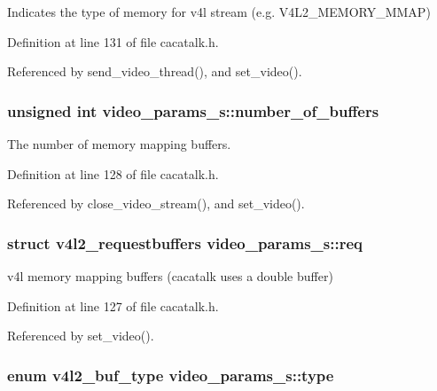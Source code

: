 \-Indicates the type of memory for v4l stream (e.\-g. \-V4\-L2\-\_\-\-M\-E\-M\-O\-R\-Y\-\_\-\-M\-M\-A\-P) 



\-Definition at line 131 of file cacatalk.\-h.



\-Referenced by send\-\_\-video\-\_\-thread(), and set\-\_\-video().

\hypertarget{structvideo__params__s_a61f9d75862499eb015a76c40c58abbd3}{
\subsubsection[{number\-\_\-of\-\_\-buffers}]{\setlength{\rightskip}{0pt plus 5cm}unsigned int {\bf video\-\_\-params\-\_\-s\-::number\-\_\-of\-\_\-buffers}}}\label{structvideo__params__s_a61f9d75862499eb015a76c40c58abbd3}


\-The number of memory mapping buffers. 



\-Definition at line 128 of file cacatalk.\-h.



\-Referenced by close\-\_\-video\-\_\-stream(), and set\-\_\-video().

\hypertarget{structvideo__params__s_a2688c600ca2c6aa4cd2e87cca2fa7909}{
\subsubsection[{req}]{\setlength{\rightskip}{0pt plus 5cm}struct v4l2\-\_\-requestbuffers {\bf video\-\_\-params\-\_\-s\-::req}}}\label{structvideo__params__s_a2688c600ca2c6aa4cd2e87cca2fa7909}


v4l memory mapping buffers (cacatalk uses a double buffer) 



\-Definition at line 127 of file cacatalk.\-h.



\-Referenced by set\-\_\-video().

\hypertarget{structvideo__params__s_a0bf1de534c89c2e3fd2c0785cd3684c0}{
\subsubsection[{type}]{\setlength{\rightskip}{0pt plus 5cm}enum v4l2\-\_\-buf\-\_\-type {\bf video\-\_\-params\-\_\-s\-::type}}}\label{structvideo__params__s_a0bf1de534c89c2e3fd2c0785cd3684c0}



